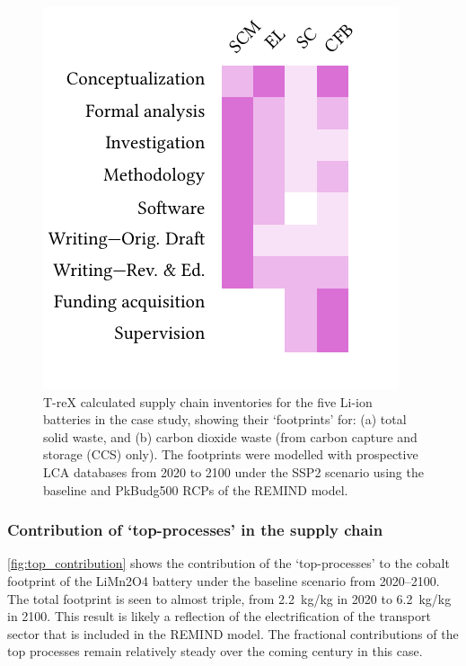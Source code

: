 \begin{figure}[H]
    \centering
    \includegraphics[width=0.7\linewidth]{figures/T-reX-wastefootprint-totalANDcarbon.pdf}
    \caption{T-reX calculated supply chain inventories for the five Li-ion batteries in the case study, showing their `footprints' for: (a) total solid waste, and (b) carbon dioxide waste (from carbon capture and storage (CCS) only). The footprints were modelled with prospective LCA databases from 2020 to 2100 under the SSP2 scenario using the baseline and PkBudg500 RCPs of the REMIND model.}\label{fig:waste_totalANDcarbon}
\end{figure}

\subsubsection{Contribution of `top-processes' in the supply chain}%

\autoref{fig:top_contribution} shows the contribution of the `top-processes' to the cobalt footprint of the LiMn2O4 battery under the baseline scenario from 2020--2100. The total footprint is seen to almost triple, from 2.2~kg/kg in 2020 to 6.2~kg/kg in 2100. This result is likely a reflection of the electrification of the transport sector that is included in the REMIND model. The fractional contributions of the top processes remain relatively steady over the coming century in this case.

